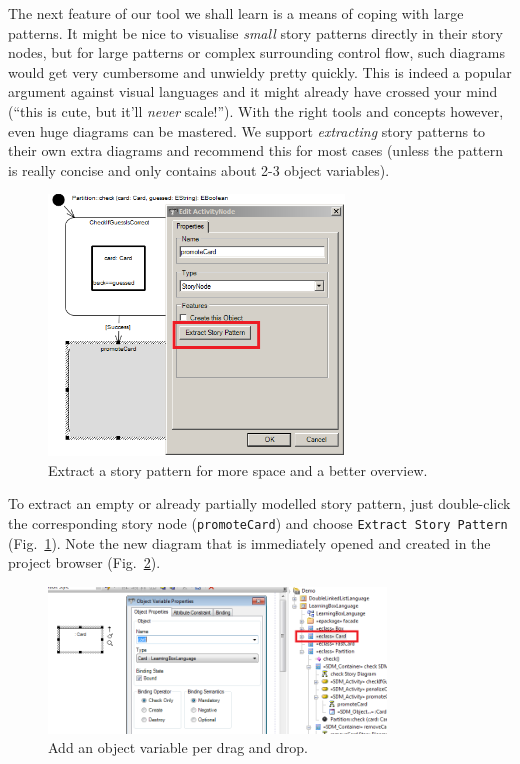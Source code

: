 The next feature of our tool we shall learn is a means of coping with large
patterns.  It might be nice to visualise \emph{small} story patterns directly in
their story nodes, but for large patterns or complex surrounding control flow,
such diagrams would get very cumbersome and unwieldy pretty quickly.  This is
indeed a popular argument against visual languages and it might already have
crossed your mind (``this is cute, but it'll \emph{never} scale!'').  With the
right tools and concepts however, even huge diagrams can be mastered.  We
support \emph{extracting} story patterns to their own extra diagrams and
recommend this for most cases (unless the pattern is really concise and
only contains about 2-3 object variables).  

\begin{figure}[htbp]
\begin{center}
  \includegraphics[width=0.7\textwidth]{pics/sdmBilder/check/sdm21}
  \caption{Extract a story pattern for more space and a better overview.}  
  \label{fig:sdm_check_extract_storypattern}
\end{center}
\end{figure}

To extract an empty or already
partially modelled story pattern, just double-click the corresponding story node
(\texttt{promoteCard}) and choose \texttt{Extract Story Pattern}
(Fig.~\ref{fig:sdm_check_extract_storypattern}). Note the new diagram that is
immediately opened and created in the project browser
(Fig.~\ref{fig:sdm_check_bound_card}).

\begin{figure}[htbp]
\begin{center}
  \includegraphics[width=0.8\textwidth]{pics/sdmBilder/check/sdm22RAW}
  \caption{Add an object variable per drag and drop.}  
  \label{fig:sdm_check_bound_card}
\end{center}
\end{figure}

